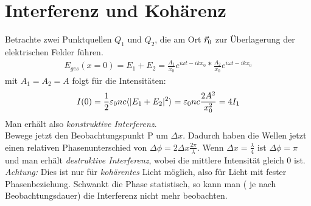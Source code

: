 \section{Interferenz und Kohärenz}
Betrachte zwei Punktquellen $Q_1$ und $Q_2$, die am Ort $\vec{r}_0$ zur Überlagerung der elektrischen Felder führen.
\begin{align*}
	E_{ges}(x=0)=E_1+E_2=\frac{A_1}{x_0}e^{i\omega t-ikx_0}*\frac{A_2}{x_0}e^{i\omega t- ikx_0}
\end{align*}
mit $A_1=A_2=A$ folgt für die Intensitäten:
\begin{align*}
	I(0)=\frac{1}{2}\varepsilon_0 nc \langle \vert E_1+E_2\vert^2 \rangle =\varepsilon_0 nc\frac{2A^2}{x_0^2}=4I_1
\end{align*}
Man erhält also \emph{konstruktive Interferenz}.\\
Bewege jetzt den Beobachtungspunkt P um $\Delta x$. 
Dadurch haben die Wellen jetzt einen relativen Phasenunterschied von $\Delta\phi=2\Delta x\frac{2\pi}{\lambda}$.
Wenn $\Delta x=\frac{\lambda}{4}$ ist $\Delta\phi=\pi$ und man erhält \emph{destruktive Interferenz}, wobei die mittlere Intensität gleich 0 ist.\\
\emph{Achtung:} Dies ist nur für \emph{kohärentes} Licht möglich, also für Licht mit fester Phasenbeziehung. Schwankt die Phase statistisch, so kann man ( je nach Beobachtungsdauer) die Interferenz nicht mehr beobachten.

